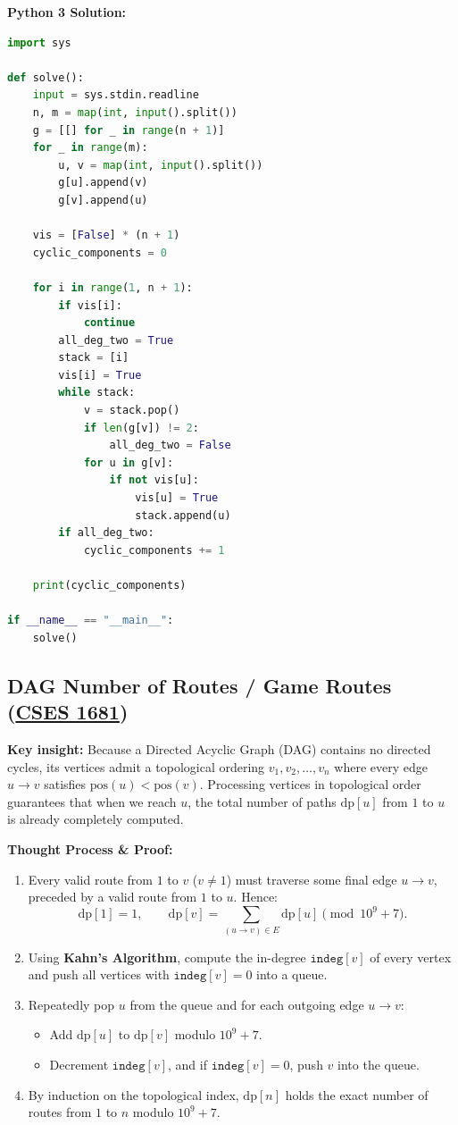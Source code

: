 \documentclass[11pt]{article}
\newcommand{\insight}[1]{\par\medskip\noindent\textbf{Key insight:} #1\par\smallskip}
\begin{document}
\textbf{Python 3 Solution:}
\begin{lstlisting}[language=Python]
import sys

def solve():
    input = sys.stdin.readline
    n, m = map(int, input().split())
    g = [[] for _ in range(n + 1)]
    for _ in range(m):
        u, v = map(int, input().split())
        g[u].append(v)
        g[v].append(u)

    vis = [False] * (n + 1)
    cyclic_components = 0

    for i in range(1, n + 1):
        if vis[i]:
            continue
        all_deg_two = True
        stack = [i]
        vis[i] = True
        while stack:
            v = stack.pop()
            if len(g[v]) != 2:
                all_deg_two = False
            for u in g[v]:
                if not vis[u]:
                    vis[u] = True
                    stack.append(u)
        if all_deg_two:
            cyclic_components += 1

    print(cyclic_components)

if __name__ == "__main__":
    solve()
\end{lstlisting}

\subsection{DAG Number of Routes / Game Routes (\href{https://cses.fi/problemset/task/1681}{CSES 1681})}

\insight{Because a Directed Acyclic Graph (DAG) contains no directed cycles, its vertices admit a topological ordering $v_1, v_2, \dots, v_n$ where every edge $u \to v$ satisfies $\text{pos}(u) < \text{pos}(v)$. Processing vertices in topological order guarantees that when we reach $u$, the total number of paths $\text{dp}[u]$ from $1$ to $u$ is already completely computed.}

\textbf{Thought Process \& Proof:}
\begin{enumerate}
    \item Every valid route from $1$ to $v$ ($v \neq 1$) must traverse some final edge $u \to v$, preceded by a valid route from $1$ to $u$. Hence:
    \[ \text{dp}[1] = 1, \qquad \text{dp}[v] = \sum_{(u \to v) \in E} \text{dp}[u] \pmod{10^9 + 7}. \]
    \item Using \textbf{Kahn's Algorithm}, compute the in-degree $\texttt{indeg}[v]$ of every vertex and push all vertices with $\texttt{indeg}[v] = 0$ into a queue.
    \item Repeatedly pop $u$ from the queue and for each outgoing edge $u \to v$:
    \begin{itemize}
        \item Add $\text{dp}[u]$ to $\text{dp}[v]$ modulo $10^9 + 7$.
        \item Decrement $\texttt{indeg}[v]$, and if $\texttt{indeg}[v] = 0$, push $v$ into the queue.
    \end{itemize}
    \item By induction on the topological index, $\text{dp}[n]$ holds the exact number of routes from $1$ to $n$ modulo $10^9 + 7$.
\end{enumerate}
\end{document}
